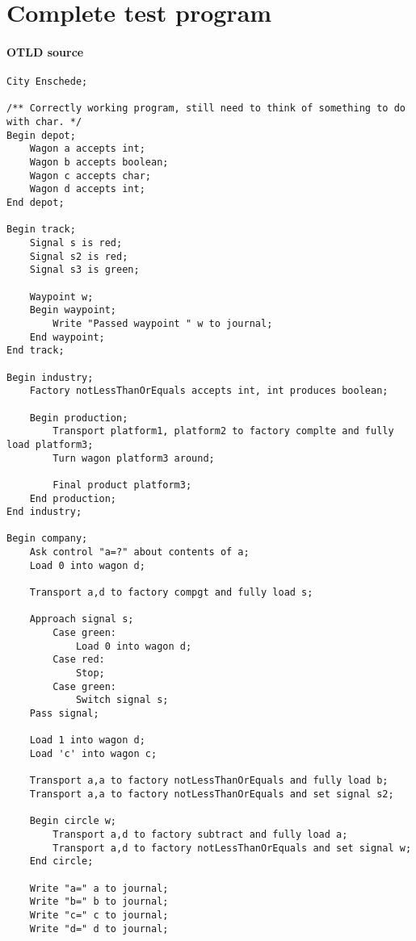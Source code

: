 \chapter{Complete test program}
\label{chap:testprogram}

\begin{landscape}
\subsubsection*{OTLD source}

\begin{lstlisting}
City Enschede;

/** Correctly working program, still need to think of something to do with char. */
Begin depot;
    Wagon a accepts int;
    Wagon b accepts boolean;
    Wagon c accepts char;
    Wagon d accepts int;
End depot;

Begin track;
    Signal s is red;
    Signal s2 is red;
    Signal s3 is green;

    Waypoint w;
    Begin waypoint;
        Write "Passed waypoint " w to journal;
    End waypoint;
End track;

Begin industry;
    Factory notLessThanOrEquals accepts int, int produces boolean;

    Begin production;
        Transport platform1, platform2 to factory complte and fully load platform3;
        Turn wagon platform3 around;

        Final product platform3;
    End production;
End industry;

Begin company;
    Ask control "a=?" about contents of a;
    Load 0 into wagon d;

    Transport a,d to factory compgt and fully load s;

    Approach signal s;
        Case green:
            Load 0 into wagon d;
        Case red:
            Stop;
        Case green:
            Switch signal s;
    Pass signal;

    Load 1 into wagon d;
    Load 'c' into wagon c;

    Transport a,a to factory notLessThanOrEquals and fully load b;
    Transport a,a to factory notLessThanOrEquals and set signal s2;

    Begin circle w;
        Transport a,d to factory subtract and fully load a;
        Transport a,d to factory notLessThanOrEquals and set signal w;
    End circle;

    Write "a=" a to journal;
    Write "b=" b to journal;
    Write "c=" c to journal;
    Write "d=" d to journal;


\end{lstlisting}
\end{landscape}
